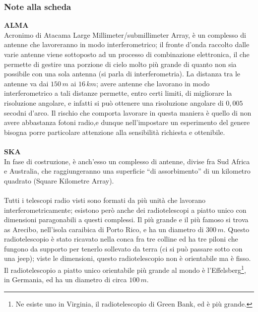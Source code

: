 \subsubsection{Note alla scheda}
\textbf{ALMA}
\\
Acronimo di Atacama Large Millimeter/submillimeter Array, è un complesso di antenne  che lavoreranno in modo interferometrico; il fronte d'onda raccolto dalle varie antenne viene sottoposto ad un processo di combinazione elettronica, il che permette di gestire una porzione di cielo molto più grande di quanto non sia possibile con una sola antenna (si parla di interferometria). La distanza tra le antenne va dai $150 \, m$ ai $16 \, km$; avere antenne che lavorano in modo interferometrico a tali distanze permette, entro certi limiti, di migliorare la risoluzione angolare, e infatti si può ottenere una risoluzione angolare di $0,005$ secodni d'arco. Il rischio che comporta lavorare in questa maniera è quello di non avere abbastanza fotoni radio,e dunque nell'impostare un esperimento del genere bisogna porre particolare attenzione alla sensibilità richiesta e ottenibile.
\\
\\
\textbf{SKA}\\
In fase di costruzione, è anch'esso un complesso di antenne, divise fra Sud Africa e Australia, che raggiungeranno una superficie ``di assorbimento'' di un kilometro quadrato (Square Kilometre Array).
\\
\\
Tutti i telescopi radio visti sono formati da più unità che lavorano interferometricamente; esistono però anche dei radiotelescopi a piatto unico con dimensioni paragonabili a questi complessi. Il più grande e il più famoso si trova as Arecibo, nell'isola caraibica di Porto Rico, e ha un diametro di $300 \, m$. Questo radiotelescopio è stato ricavato nella conca fra tre colline ed ha tre piloni che fungono da supporto per tenerlo sollevato da terra (ci si può passare sotto con una jeep); viste le dimensioni, questo radiotelescopio non è orientabile ma è fisso.\\
Il radiotelescopio a piatto unico orientabile  più grande al mondo è l'Effelsberg\footnote{Ne esiste uno in Virginia, il radiotelescopio di Green Bank, ed è più grande.}, in Germania, ed ha un diametro di circa $100 \, m$.


\clearpage


